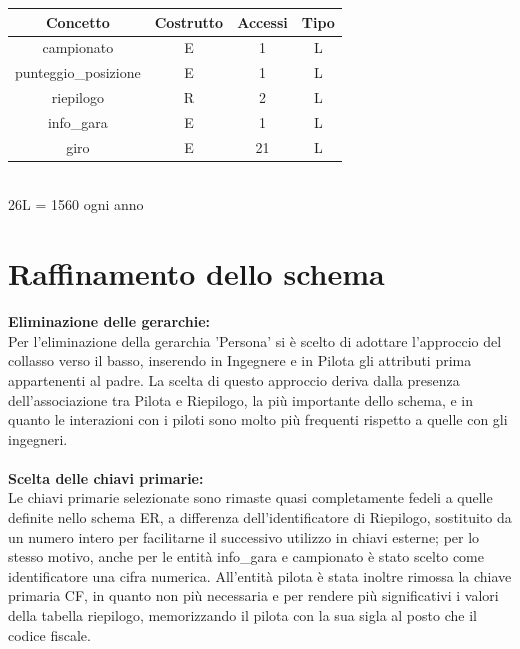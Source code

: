 \documentclass[a4paper,12pt]{report}
\begin{document}
{\begin{table}[h!]
\begin{center}
{\begin{tabular}{|c|c|c|c|}
							\hline\rowcolor{Rosso}
							\toprule
							\textbf{Concetto} & \textbf{Costrutto} & \textbf{Accessi} & \textbf{Tipo}\\
							\midrule
							campionato 				& E & 1 	& L\\
							punteggio\_posizione 	& E & 1 & L\\
							riepilogo 				& R & 2 	& L\\
							info\_gara 				& E & 1 	& L\\
							giro 					& E & 21 	& L\\
							\bottomrule
					\end{tabular}}
				\newline\\
				26L = 1560 ogni anno\\
				\end{center}
			\end{table}
		\section{Raffinamento dello schema}
			{\fontsize{12.5}{20}\selectfont
			\textbf{Eliminazione delle gerarchie:}\\
				Per l'eliminazione della gerarchia 'Persona' si è scelto di adottare l'approccio del collasso verso il basso,
				inserendo in Ingegnere e in Pilota gli attributi prima appartenenti al padre.
				La scelta di questo approccio deriva dalla presenza dell'associazione tra Pilota e Riepilogo, la più importante dello schema, e in quanto le interazioni con i piloti sono molto più frequenti rispetto a quelle con gli ingegneri.
			\\\\
			\textbf{Scelta delle chiavi primarie:}\\
				Le chiavi primarie selezionate sono rimaste quasi completamente fedeli a quelle definite nello schema ER,
				a differenza dell'identificatore di Riepilogo, sostituito da un numero intero per facilitarne il successivo utilizzo
				in chiavi esterne; per lo stesso motivo, anche per le entità info\_gara e campionato è stato scelto come identificatore
				una cifra numerica.
				All'entità pilota è stata inoltre rimossa la chiave primaria CF, in quanto non più necessaria e per rendere
				più significativi i valori della tabella riepilogo, memorizzando il pilota con la sua sigla al posto che il codice fiscale.}
		\pagebreak
}
\end{document}
